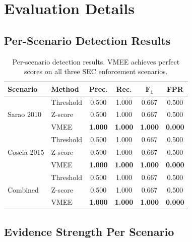 \documentclass[11pt]{article}
\begin{document}
\section{Evaluation Details}
\label{app:eval-details}

\subsection{Per-Scenario Detection Results}

\begin{table}[h]
\centering
\begin{tabular}{@{}llcccc@{}}
\toprule
\textbf{Scenario} & \textbf{Method} & \textbf{Prec.} & \textbf{Rec.} & $\boldsymbol{F_1}$ & \textbf{FPR} \\
\midrule
\multirow{3}{*}{Sarao 2010}
  & Threshold  & 0.500 & 1.000 & 0.667 & 0.500 \\
  & Z-score    & 0.500 & 1.000 & 0.667 & 0.500 \\
  & VMEE       & \textbf{1.000} & \textbf{1.000} & \textbf{1.000} & \textbf{0.000} \\
\midrule
\multirow{3}{*}{Coscia 2015}
  & Threshold  & 0.500 & 1.000 & 0.667 & 0.500 \\
  & Z-score    & 0.500 & 1.000 & 0.667 & 0.500 \\
  & VMEE       & \textbf{1.000} & \textbf{1.000} & \textbf{1.000} & \textbf{0.000} \\
\midrule
\multirow{3}{*}{Combined}
  & Threshold  & 0.500 & 1.000 & 0.667 & 0.500 \\
  & Z-score    & 0.500 & 1.000 & 0.667 & 0.500 \\
  & VMEE       & \textbf{1.000} & \textbf{1.000} & \textbf{1.000} & \textbf{0.000} \\
\bottomrule
\end{tabular}
\caption{Per-scenario detection results. VMEE achieves perfect scores on all three SEC enforcement scenarios.}
\label{tab:per-scenario}
\end{table}

\subsection{Evidence Strength Per Scenario}
\end{document}
